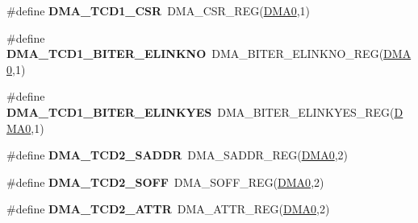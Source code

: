 \begin{DoxyCompactItemize}
\item 
\#define {\bfseries D\+M\+A\+\_\+\+T\+C\+D1\+\_\+\+C\+SR}~D\+M\+A\+\_\+\+C\+S\+R\+\_\+\+R\+EG(\hyperlink{group__DMA__Peripheral__Access__Layer_ga4103044f9ca209772f513dc694513ffb}{D\+M\+A0},1)\hypertarget{group__DMA__Register__Accessor__Macros_gacad240efa4ab3711d61d1b82c5eedae2}{}\label{group__DMA__Register__Accessor__Macros_gacad240efa4ab3711d61d1b82c5eedae2}

\item 
\#define {\bfseries D\+M\+A\+\_\+\+T\+C\+D1\+\_\+\+B\+I\+T\+E\+R\+\_\+\+E\+L\+I\+N\+K\+NO}~D\+M\+A\+\_\+\+B\+I\+T\+E\+R\+\_\+\+E\+L\+I\+N\+K\+N\+O\+\_\+\+R\+EG(\hyperlink{group__DMA__Peripheral__Access__Layer_ga4103044f9ca209772f513dc694513ffb}{D\+M\+A0},1)\hypertarget{group__DMA__Register__Accessor__Macros_ga898031f3c7ec06acd31e0daee2d983d3}{}\label{group__DMA__Register__Accessor__Macros_ga898031f3c7ec06acd31e0daee2d983d3}

\item 
\#define {\bfseries D\+M\+A\+\_\+\+T\+C\+D1\+\_\+\+B\+I\+T\+E\+R\+\_\+\+E\+L\+I\+N\+K\+Y\+ES}~D\+M\+A\+\_\+\+B\+I\+T\+E\+R\+\_\+\+E\+L\+I\+N\+K\+Y\+E\+S\+\_\+\+R\+EG(\hyperlink{group__DMA__Peripheral__Access__Layer_ga4103044f9ca209772f513dc694513ffb}{D\+M\+A0},1)\hypertarget{group__DMA__Register__Accessor__Macros_ga0484b8606e5656a358ba3a3a1e7f7623}{}\label{group__DMA__Register__Accessor__Macros_ga0484b8606e5656a358ba3a3a1e7f7623}

\item 
\#define {\bfseries D\+M\+A\+\_\+\+T\+C\+D2\+\_\+\+S\+A\+D\+DR}~D\+M\+A\+\_\+\+S\+A\+D\+D\+R\+\_\+\+R\+EG(\hyperlink{group__DMA__Peripheral__Access__Layer_ga4103044f9ca209772f513dc694513ffb}{D\+M\+A0},2)\hypertarget{group__DMA__Register__Accessor__Macros_gad1ffbc1cb0292663f36900d4e1c25580}{}\label{group__DMA__Register__Accessor__Macros_gad1ffbc1cb0292663f36900d4e1c25580}

\item 
\#define {\bfseries D\+M\+A\+\_\+\+T\+C\+D2\+\_\+\+S\+O\+FF}~D\+M\+A\+\_\+\+S\+O\+F\+F\+\_\+\+R\+EG(\hyperlink{group__DMA__Peripheral__Access__Layer_ga4103044f9ca209772f513dc694513ffb}{D\+M\+A0},2)\hypertarget{group__DMA__Register__Accessor__Macros_ga778e50197a65e123a80815d1870b42b0}{}\label{group__DMA__Register__Accessor__Macros_ga778e50197a65e123a80815d1870b42b0}

\item 
\#define {\bfseries D\+M\+A\+\_\+\+T\+C\+D2\+\_\+\+A\+T\+TR}~D\+M\+A\+\_\+\+A\+T\+T\+R\+\_\+\+R\+EG(\hyperlink{group__DMA__Peripheral__Access__Layer_ga4103044f9ca209772f513dc694513ffb}{D\+M\+A0},2)\hypertarget{group__DMA__Register__Accessor__Macros_ga18a70afba86453e8b5e9c89f22a11412}{}\label{group__DMA__Register__Accessor__Macros_ga18a70afba86453e8b5e9c89f22a11412}


\end{DoxyCompactItemize}
